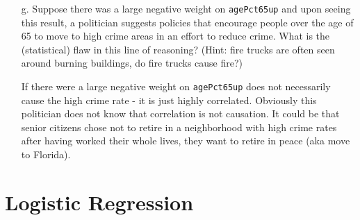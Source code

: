 \documentclass[shortlabels]{article}
\begin{document}
\begin{aprob}
\begin{enumerate}
        \newpage
        \item[g.]  Suppose there was a large negative weight on \texttt{agePct65up} and upon seeing this result, a politician suggests policies that encourage people over the age of 65 to move to high crime areas in an effort to reduce crime. What is the (statistical) flaw in this line of reasoning? (Hint: fire trucks
        are often seen around burning buildings, do fire trucks cause fire?)
    
        If there were a large negative weight on \texttt{agePct65up} does not necessarily cause the high crime rate - it is just highly correlated. Obviously this politician does not know that correlation is not causation. It could be that senior citizens chose not to retire in a neighborhood with high crime rates after having worked their whole lives, they want to retire in peace (aka move to Florida).
    \end{enumerate}
    \newpage
\end{aprob}

\section*{Logistic Regression}
\end{document}
